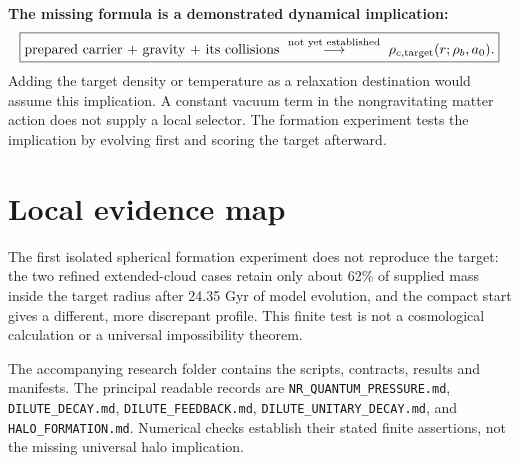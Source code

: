 \documentclass[11pt]{article}
\begin{document}
\medskip\noindent\textbf{The missing formula is a demonstrated dynamical implication:}
\begin{equation}
 \boxed{\text{prepared carrier + gravity + its collisions}
 \ \stackrel{\text{not yet established}}{\longrightarrow}\
 \rho_{c,\rm target}(r;\rho_b,a_0).}
\end{equation}
Adding the target density or temperature as a relaxation destination would assume this implication. A constant vacuum term in the nongravitating matter action does not supply a local selector. The formation experiment tests the implication by evolving first and scoring the target afterward.

\section*{Local evidence map}
The first isolated spherical formation experiment does not reproduce the target: the two refined extended-cloud cases retain only about 62\% of supplied mass inside the target radius after 24.35 Gyr of model evolution, and the compact start gives a different, more discrepant profile. This finite test is not a cosmological calculation or a universal impossibility theorem.

The accompanying research folder contains the scripts, contracts, results and manifests. The principal readable records are \texttt{NR\_QUANTUM\_PRESSURE.md}, \texttt{DILUTE\_DECAY.md}, \texttt{DILUTE\_FEEDBACK.md}, \texttt{DILUTE\_UNITARY\_DECAY.md}, and \texttt{HALO\_FORMATION.md}. Numerical checks establish their stated finite assertions, not the missing universal halo implication.
\end{document}
